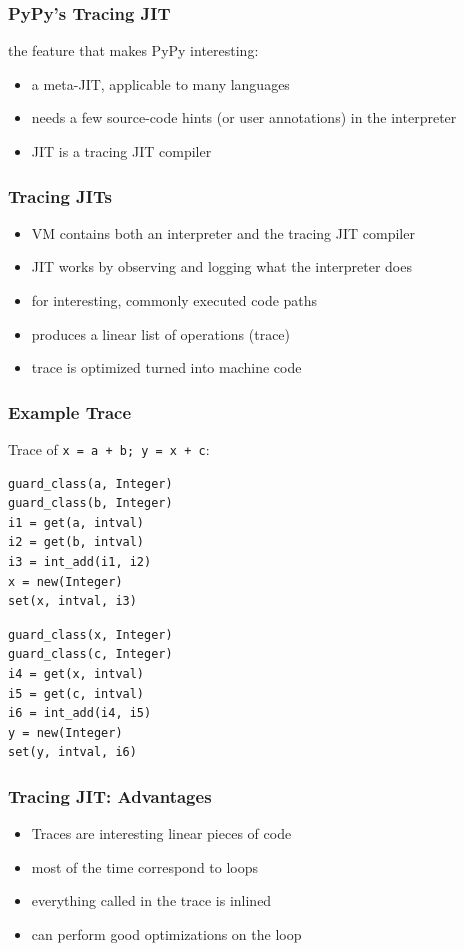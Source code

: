 \documentclass[utf8x]{beamer}
\begin{document}
\begin{frame}
  \frametitle{PyPy's Tracing JIT}
  the feature that makes PyPy interesting:
  \begin{itemize}
      \item a meta-JIT, applicable to many languages
      \item needs a few source-code hints (or user annotations) in the interpreter
      \item JIT is a tracing JIT compiler
  \end{itemize}
\end{frame}

\begin{frame}
  \frametitle{Tracing JITs}
  \begin{itemize}
      \item VM contains both an interpreter and the tracing JIT compiler
      \item JIT works by observing and logging what the interpreter does
      \item for interesting, commonly executed code paths
      \item produces a linear list of operations (trace)
      \item trace is optimized turned into machine code
  \end{itemize}
\end{frame}

\begin{frame}[containsverbatim]
  \frametitle{Example Trace}
  Trace of \texttt{x = a + b; y = x + c}:
\begin{verbatim}
guard_class(a, Integer)
guard_class(b, Integer)
i1 = get(a, intval)
i2 = get(b, intval)
i3 = int_add(i1, i2)
x = new(Integer)
set(x, intval, i3)
\end{verbatim}
\pause
\begin{verbatim}
guard_class(x, Integer)
guard_class(c, Integer)
i4 = get(x, intval)
i5 = get(c, intval)
i6 = int_add(i4, i5)
y = new(Integer)
set(y, intval, i6)
\end{verbatim}
\end{frame}

\begin{frame}
  \frametitle{Tracing JIT: Advantages}
  \begin{itemize}
      \item Traces are interesting linear pieces of code
      \item most of the time correspond to loops
      \item everything called in the trace is inlined
      \item can perform good optimizations on the loop
  \end{itemize}
\end{frame}
\end{document}
